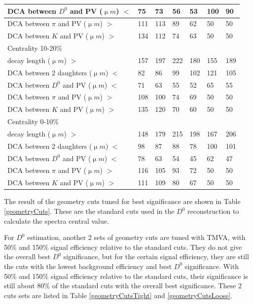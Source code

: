 \begin{table}[htp]
\begin{center}
\begin{tabular}{l|l|l|l|l|l|l}
      DCA between $D^0$ and PV (${\upmu}m$) $<$ & 75 & 73 & 56 & 53 & 100 & 90\\ \hline
      DCA between $\pi$ and PV (${\upmu}m$) $>$ & 111 & 113 & 89 & 62 & 50 & 50\\ \hline
      DCA between $K$ and PV (${\upmu}m$) $>$ & 134 & 112 & 74 & 63 & 50 & 50\\ \hline
      Centrality  10-20\% &  &  &  &  & & \\ \hline
      decay length (${\upmu}m$) $>$ & 157 & 197 & 222 & 180 & 155 & 189\\ \hline
      DCA between 2 daughters (${\upmu}m$) $<$ & 82 & 86 & 99 & 102 & 121 & 105\\ \hline
      DCA between $D^0$ and PV (${\upmu}m$) $<$ & 71 & 63 & 55 & 52 & 65 & 55\\ \hline
      DCA between $\pi$ and PV (${\upmu}m$) $>$ & 108 & 100 & 74 & 69 & 50 & 50\\ \hline
      DCA between $K$ and PV (${\upmu}m$) $>$ & 135 & 120 & 70 & 60 & 50 & 50\\ \hline
      Centrality  0-10\% &  &  &  &  & & \\ \hline
      decay length (${\upmu}m$) $>$ & 148 & 179 & 215 & 198 & 167 & 206\\ \hline
      DCA between 2 daughters (${\upmu}m$) $<$ & 98 & 87 & 88 & 78 & 100 & 101\\ \hline
      DCA between $D^0$ and PV (${\upmu}m$) $<$ & 78 & 63 & 54 & 45 & 62 & 47\\ \hline
      DCA between $\pi$ and PV (${\upmu}m$) $>$ & 116 & 105 & 93 & 72 & 50 & 50\\ \hline
      DCA between $K$ and PV (${\upmu}m$) $>$ & 111 & 109 & 80 & 67 & 50 & 50\\ \hline
    \end{tabular}
  \end{center}
\end{table}

The result of the geometry cuts tuned for best significance are shown in Table \ref{geometryCuts}. These are the standard cuts used in the $D^0$ reconstruction to calculate the spectra central value.

For $D^0$ estimation, another 2 sets of geometry cuts are tuned with TMVA, with 50\% and 150\% signal efficiency relative to the standard cuts. They do not give the overall best $D^0$ significance, but for the certain signal efficiency, they are still the cuts with the lowest background efficiency and best $D^0$ significance. With 50\% and 150\% signal efficiency relative to the standard cuts, their significance is still about 80\% of the standard cuts with the overall best significance. These 2 cuts sets are listed in Table \ref{geometryCutsTight} and \ref{geometryCutsLoose}.

